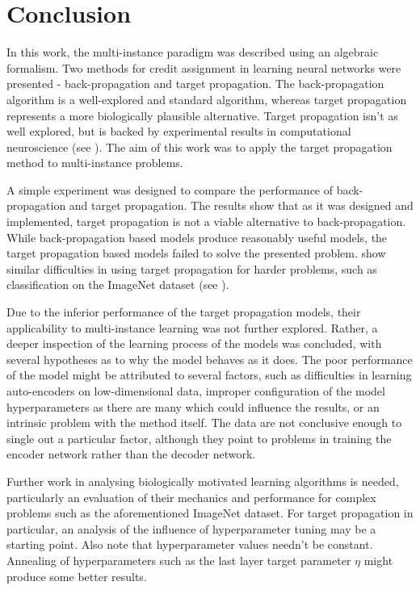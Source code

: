 \chapter*{Conclusion}

In this work, the multi-instance paradigm was described using an algebraic formalism. Two methods for credit assignment in learning neural networks were presented - back-propagation and target propagation. The back-propagation algorithm is a well-explored and standard algorithm, whereas target propagation represents a more biologically plausible alternative. Target propagation isn't as well explored, but is backed by experimental results in computational neuroscience (see \cite{guerguiev_towards_2017}). The aim of this work was to apply the target propagation method to multi-instance problems.

A simple experiment was designed to compare the performance of back-propagation and target propagation. The results show that as it was designed and implemented, target propagation is not a viable alternative to back-propagation. While back-propagation based models produce reasonably useful models, the target propagation based models failed to solve the presented problem. \cite{bartunov_assessing_2018} show similar difficulties in using target propagation for harder problems, such as classification on the ImageNet dataset (see \cite{russakovsky_imagenet_2015}).

Due to the inferior performance of the target propagation models, their applicability to multi-instance learning was not further explored. Rather, a deeper inspection of the learning process of the models was concluded, with several hypotheses as to why the model behaves as it does. The poor performance of the model might be attributed to several factors, such as difficulties in learning auto-encoders on low-dimensional data, improper configuration of the model hyperparameters as there are many which could influence the results, or an intrinsic problem with the method itself. The data are not conclusive enough to single out a particular factor, although they point to problems in training the encoder network rather than the decoder network.

Further work in analysing biologically motivated learning algorithms is needed, particularly an evaluation of their mechanics and performance for complex problems such as the aforementioned ImageNet dataset. For target propagation in particular, an analysis of the influence of hyperparameter tuning may be a starting point. Also note that hyperparameter values needn't be constant. Annealing of hyperparameters such as the last layer target parameter \( \eta \) might produce some better results.
